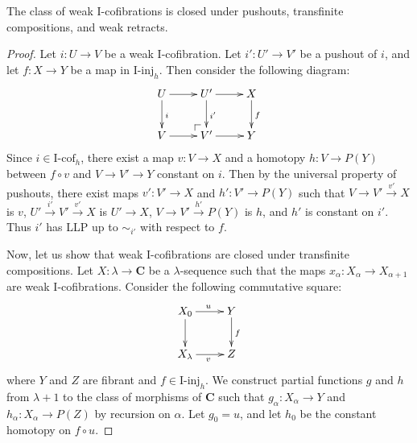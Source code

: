 \documentclass{tac}
\makeatletter
\theoremstyle{definition}
\newcommand{\cat}[1]{\mathbf{#1}}
\newcommand{\C}{\cat{C}}
\newcommand{\I}{\mathrm{I}}
\newcommand{\class}[2]{#1\text{-}\mathrm{#2}}
\newcommand{\Iinj}[1][\I]{\class{#1}{inj}}
\newcommand{\Icof}[1][\I]{\class{#1}{cof}}
\newcommand{\po}[1][dr]{\save*!/#1+1.2pc/#1:(1,-1)@^{|-}\restore}
\makeatother
\begin{document}
\begin{prop}
The class of weak $\I$-cofibrations is closed under pushouts, transfinite compositions, and weak retracts.
\end{prop}
\begin{proof}
Let $i : U \to V$ be a weak $\I$-cofibration.
Let $i' : U' \to V'$ be a pushout of $i$, and let $f : X \to Y$ be a map in $\Iinj_h$.
Then consider the following diagram:
\[ \xymatrix{ U \ar[r] \ar[d]^i &     U' \ar[r] \ar[d]^{i'} & X \ar[d]^f \\
              V \ar[r]          & \po V' \ar[r]             & Y
            } \]
Since $i \in \Icof_h$, there exist a map $v : V \to X$ and a homotopy $h : V \to P(Y)$ between $f \circ v$ and $V \to V' \to Y$ constant on $i$.
Then by the universal property of pushouts, there exist maps $v' : V' \to X$ and $h' : V' \to P(Y)$ such that $V \to V' \xrightarrow{v'} X$ is $v$,
$U' \xrightarrow{i'} V' \xrightarrow{v'} X$ is $U' \to X$, $V \to V' \xrightarrow{h'} P(Y)$ is $h$, and $h'$ is constant on $i'$.
Thus $i'$ has LLP up to $\sim_{i'}$ with respect to $f$.

Now, let us show that weak $\I$-cofibrations are closed under transfinite compositions.
Let $X : \lambda \to \C$ be a $\lambda$-sequence such that the maps $x_\alpha : X_\alpha \to X_{\alpha+1}$ are weak $\I$-cofibrations.
Consider the following commutative square:
\[ \xymatrix{ X_0 \ar[r]^u \ar[d] & Y \ar[d]^f \\
              X_\lambda \ar[r]_v & Z
            } \]
where $Y$ and $Z$ are fibrant and $f \in \Iinj_h$.
We construct partial functions $g$ and $h$ from $\lambda+1$ to the class of morphisms of $\C$
such that $g_\alpha : X_\alpha \to Y$ and $h_\alpha : X_\alpha \to P(Z)$ by recursion on $\alpha$.
Let $g_0 = u$, and let $h_0$ be the constant homotopy on $f \circ u$.


\end{proof}
\end{document}
